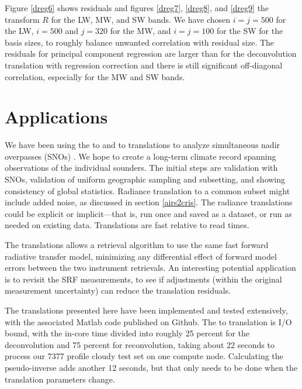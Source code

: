 \documentclass[10pt,twocolumn]{article}
\begin{document}
Figure \ref{dreg6} shows residuals and figures \ref{dreg7},
\ref{dreg8}, and \ref{dreg9} the transform $R$ for the {\cris} LW,
MW, and SW bands.  We have chosen $i = j = 500$ for the LW, $i =
500$ and $j = 320$ for the MW, and $i = j = 100$ for the SW for the
basis sizes, to roughly balance unwanted correlation with residual
size.  The residuals for principal component regression are larger
than for the deconvolution translation with regression correction
and there is still significant off-diagonal correlation, especially
for the MW and SW bands.

\section{Applications}  
\label{appcon}

We have been using the {\airs} to {\cris} and {\iasi} to {\cris}
translations to analyze simultaneous nadir overpasses (SNOs)
\cite{sno1}.  We hope to create a long-term climate record spanning
observations of the individual sounders.  The initial steps are
validation with SNOs, validation of uniform geographic sampling and
subsetting, and showing consistency of global statistics.  Radiance
translation to a common subset might include added noise, as
discussed in section \ref{airs2cris}.  The radiance translations
could be explicit or implicit---that is, run once and saved as a
dataset, or run as needed on existing data.  Translations are fast
relative to read times.

The translations allows a retrieval algorithm to use the same fast
forward radiative transfer model, minimizing any differential effect
of forward model errors between the two instrument retrievals.  
An interesting potential application is to revisit the {\airs} SRF
measurements, to see if adjustments (within the original measurement
uncertainty) can reduce the translation residuals.

The translations presented here have been implemented and tested
extensively, with the associated Matlab code published on Github.
The {\airs} to {\cris} translation is I/O bound, with the in-core
time divided into roughly 25 percent for the deconvolution and 75
percent for reconvolution, taking about 22 seconds to process our
7377 profile cloudy test set on one compute node.  Calculating the
pseudo-inverse adds another 12 seconds, but that only needs to be
done when the translation parameters change.
\end{document}
